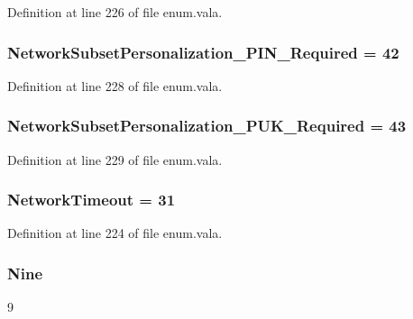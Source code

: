 Definition at line 226 of file enum.\-vala.

\hypertarget{enum_8vala_ab5e1eafc06b18ba9a01ff1303f6ac7d3}{
\subsubsection[{Network\-Subset\-Personalization\-\_\-\-P\-I\-N\-\_\-\-Required}]{\setlength{\rightskip}{0pt plus 5cm}Network\-Subset\-Personalization\-\_\-\-P\-I\-N\-\_\-\-Required = 42}}\label{enum_8vala_ab5e1eafc06b18ba9a01ff1303f6ac7d3}


Definition at line 228 of file enum.\-vala.

\hypertarget{enum_8vala_acdd77dc52889560a611220da02f98835}{
\subsubsection[{Network\-Subset\-Personalization\-\_\-\-P\-U\-K\-\_\-\-Required}]{\setlength{\rightskip}{0pt plus 5cm}Network\-Subset\-Personalization\-\_\-\-P\-U\-K\-\_\-\-Required = 43}}\label{enum_8vala_acdd77dc52889560a611220da02f98835}


Definition at line 229 of file enum.\-vala.

\hypertarget{enum_8vala_a4ab8d67ce74f17111c2c63028b724909}{
\subsubsection[{Network\-Timeout}]{\setlength{\rightskip}{0pt plus 5cm}Network\-Timeout = 31}}\label{enum_8vala_a4ab8d67ce74f17111c2c63028b724909}


Definition at line 224 of file enum.\-vala.

\hypertarget{enum_8vala_abd916c08d176f7a521336059e38f4b25}{
\subsubsection[{Nine}]{\setlength{\rightskip}{0pt plus 5cm}Nine}}\label{enum_8vala_abd916c08d176f7a521336059e38f4b25}
9 

